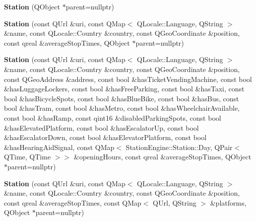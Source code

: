 \begin{DoxyCompactItemize}
\item 
\mbox{\label{classStationEngine_1_1Station_a54542aa8514f0662ea794ec2107fe4b7}} 
{\bfseries Station} (Q\+Object $\ast$parent=nullptr)
\item 
\mbox{\label{classStationEngine_1_1Station_af26ab1794c2fbb8284f03b550fe7e55e}} 
{\bfseries Station} (const Q\+Url \&uri, const Q\+Map$<$ Q\+Locale\+::\+Language, Q\+String $>$ \&name, const Q\+Locale\+::\+Country \&country, const Q\+Geo\+Coordinate \&position, const qreal \&average\+Stop\+Times, Q\+Object $\ast$parent=nullptr)
\item 
\mbox{\label{classStationEngine_1_1Station_a0e070e893487439f6754a327e18290e7}} 
{\bfseries Station} (const Q\+Url \&uri, const Q\+Map$<$ Q\+Locale\+::\+Language, Q\+String $>$ \&name, const Q\+Locale\+::\+Country \&country, const Q\+Geo\+Coordinate \&position, const Q\+Geo\+Address \&address, const bool \&has\+Ticket\+Vending\+Machine, const bool \&has\+Luggage\+Lockers, const bool \&has\+Free\+Parking, const bool \&has\+Taxi, const bool \&has\+Bicycle\+Spots, const bool \&has\+Blue\+Bike, const bool \&has\+Bus, const bool \&has\+Tram, const bool \&has\+Metro, const bool \&has\+Wheelchair\+Available, const bool \&has\+Ramp, const qint16 \&disabled\+Parking\+Spots, const bool \&has\+Elevated\+Platform, const bool \&has\+Escalator\+Up, const bool \&has\+Escalator\+Down, const bool \&has\+Elevator\+Platform, const bool \&has\+Hearing\+Aid\+Signal, const Q\+Map$<$ Station\+Engine\+::\+Station\+::\+Day, Q\+Pair$<$ Q\+Time, Q\+Time $>$$>$ \&opening\+Hours, const qreal \&average\+Stop\+Times, Q\+Object $\ast$parent=nullptr)
\item 
\mbox{\label{classStationEngine_1_1Station_ae2a76b5d0ad7ab11db0a8ef519ac6d3e}} 
{\bfseries Station} (const Q\+Url \&uri, const Q\+Map$<$ Q\+Locale\+::\+Language, Q\+String $>$ \&name, const Q\+Locale\+::\+Country \&country, const Q\+Geo\+Coordinate \&position, const qreal \&average\+Stop\+Times, const Q\+Map$<$ Q\+Url, Q\+String $>$ \&platforms, Q\+Object $\ast$parent=nullptr)
\item 
\mbox{\label{classStationEngine_1_1Station_a4b2f5290d898b2362fd444610ab6cf0a}} 
$$
\end{DoxyCompactItemize}

